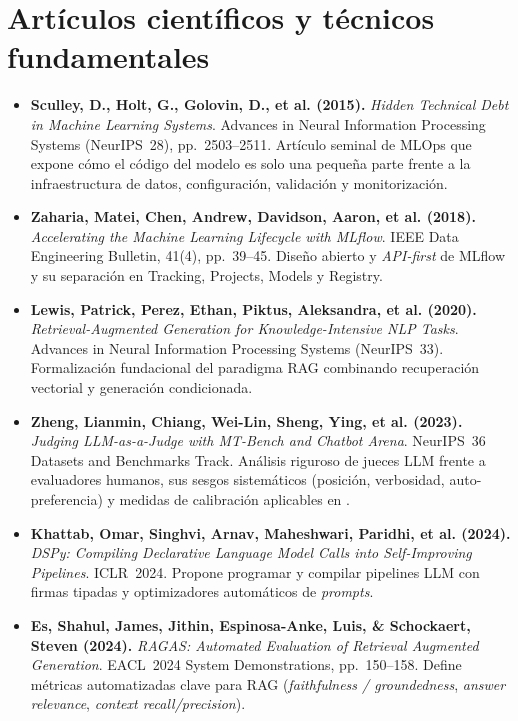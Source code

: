 \section{Artículos científicos y técnicos fundamentales}\label{sec:bib-papers}

{\small
\begin{itemize}[itemsep=3pt, topsep=3pt]
  \item \textbf{Sculley, D., Holt, G., Golovin, D., et al. (2015).} \textit{Hidden Technical Debt in Machine Learning Systems}. Advances in Neural Information Processing Systems (NeurIPS~28), pp.~2503--2511.
  Artículo seminal de MLOps que expone cómo el código del modelo es solo una pequeña parte frente a la infraestructura de datos, configuración, validación y monitorización.

  \item \textbf{Zaharia, Matei, Chen, Andrew, Davidson, Aaron, et al. (2018).} \textit{Accelerating the Machine Learning Lifecycle with MLflow}. IEEE Data Engineering Bulletin, 41(4), pp.~39--45.
  Diseño abierto y \textit{API-first} de MLflow y su separación en Tracking, Projects, Models y Registry.

  \item \textbf{Lewis, Patrick, Perez, Ethan, Piktus, Aleksandra, et al. (2020).} \textit{Retrieval-Augmented Generation for Knowledge-Intensive NLP Tasks}. Advances in Neural Information Processing Systems (NeurIPS~33).
  Formalización fundacional del paradigma RAG combinando recuperación vectorial y generación condicionada.

  \item \textbf{Zheng, Lianmin, Chiang, Wei-Lin, Sheng, Ying, et al. (2023).} \textit{Judging LLM-as-a-Judge with MT-Bench and Chatbot Arena}. NeurIPS~36 Datasets and Benchmarks Track.
  Análisis riguroso de jueces LLM frente a evaluadores humanos, sus sesgos sistemáticos (posición, verbosidad, auto-preferencia) y medidas de calibración aplicables en .

  \item \textbf{Khattab, Omar, Singhvi, Arnav, Maheshwari, Paridhi, et al. (2024).} \textit{DSPy: Compiling Declarative Language Model Calls into Self-Improving Pipelines}. ICLR~2024.
  Propone programar y compilar pipelines LLM con firmas tipadas y optimizadores automáticos de \textit{prompts}.

  \item \textbf{Es, Shahul, James, Jithin, Espinosa-Anke, Luis, \& Schockaert, Steven (2024).} \textit{RAGAS: Automated Evaluation of Retrieval Augmented Generation}. EACL~2024 System Demonstrations, pp.~150--158.
  Define métricas automatizadas clave para RAG (\textit{faithfulness / groundedness}, \textit{answer relevance}, \textit{context recall/precision}).


\end{itemize}}
